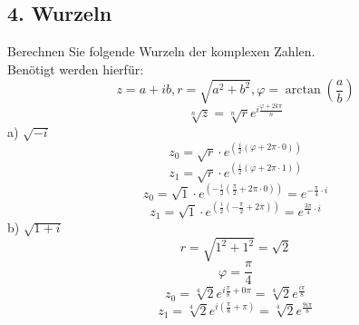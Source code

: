\documentclass{article}
\begin{document}
     \subsection*{4. Wurzeln}
     Berechnen Sie folgende Wurzeln der komplexen Zahlen.\\
     Benötigt werden hierfür:
    \begin{equation*}
        z = a + ib, r = \sqrt{a^2 + b^2}, \varphi=\arctan\left(\frac{a}{b}\right)
    \end{equation*}
    \begin{equation*}
        \sqrt[n]{z} = \sqrt[n]{r}e^{i\frac{\varphi+2k\pi}{n}}
     \end{equation*}
     a) $\sqrt{-i}$
     \begin{equation*}
        z_0 = \sqrt{r}\cdot e^{\left(\frac{i}{2}\left(\varphi + 2 \pi \cdot 0\right)\right)}
     \end{equation*}
     \begin{equation*}
        z_1 = \sqrt{r} \cdot e^{\left(\frac{i}{2}\left(\varphi + 2 \pi \cdot 1\right)\right)}
     \end{equation*}
     \begin{equation*}
        z_0 = \sqrt{1} \cdot e^{\left(-\frac{i}{2}\left(\frac{\pi}{2} + 2 \pi \cdot 0\right)\right)} = e^{-\frac{\pi}{4} \cdot i}
     \end{equation*}
     \begin{equation*}
        z_1 = \sqrt{1} \cdot e^{\left(\frac{i}{2}\left(-\frac{\pi}{2} + 2 \pi\right)\right)} = e^{\frac{3\pi}{4}\cdot i}
     \end{equation*}
     b) $\sqrt{1+i}$
     \begin{equation*}
        r = \sqrt{1^2 + 1^2} = \sqrt{2}
     \end{equation*}
     \begin{equation*}
        \varphi = \frac{\pi}{4}
     \end{equation*}
     \begin{equation*}
        z_0 = \sqrt[4]{2}e^{i\frac{\pi}{8}+0\pi} = \sqrt[4]{2}e^{\frac{i\pi}{8}}
     \end{equation*}
    \begin{equation*}
        z_1 = \sqrt[4]{2}e^{i \left( \frac{\pi}{8} + \pi\right)} = \sqrt[4]{2}e^{\frac{9i\pi}{8}}
    \end{equation*}
\end{document}

